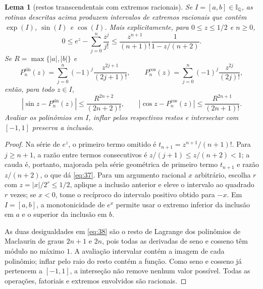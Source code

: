 \documentclass[11pt,a4paper]{article}
\theoremstyle{preciso}
\newtheorem{lema}[teorema]{Lema}
\theoremstyle{definition}
\newcommand{\Q}{\mathbb Q}
\newcommand{\eqn}[2]{\begin{equation}\label{eq:#1}#2\end{equation}}
\begin{document}
\begin{lema}[restos transcendentais com extremos racionais]
Se $I=[a,b]\in\mathbb I_{\Q}$, as rotinas descritas acima produzem intervalos de extremos racionais que contêm $\exp(I)$, $\sin(I)$ e $\cos(I)$. Mais explicitamente, para $0\le z\le1/2$ e $n\ge0$,
\eqn{37}{0\le e^z-\sum_{j=0}^n\frac{z^j}{j!}
\le\frac{z^{n+1}}{(n+1)!}\frac1{1-z/(n+2)}.}
Se $R=\max\{|a|,|b|\}$ e
\[
P_n^{\sin}(z)=\sum_{j=0}^n(-1)^j\frac{z^{2j+1}}{(2j+1)!},\qquad
P_n^{\cos}(z)=\sum_{j=0}^n(-1)^j\frac{z^{2j}}{(2j)!},
\]
então, para todo $z\in I$,
\eqn{38}{|\sin z-P_n^{\sin}(z)|\le\frac{R^{2n+2}}{(2n+2)!},\qquad
|\cos z-P_n^{\cos}(z)|\le\frac{R^{2n+1}}{(2n+1)!}.}
Avaliar os polinômios em $I$, inflar pelos respectivos restos e intersectar com $[-1,1]$ preserva a inclusão.
\end{lema}
\begin{proof}
Na série de $e^z$, o primeiro termo omitido é $t_{n+1}=z^{n+1}/(n+1)!$. Para $j\ge n+1$, a razão entre termos consecutivos é $z/(j+1)\le z/(n+2)<1$; a cauda é, portanto, majorada pela série geométrica de primeiro termo $t_{n+1}$ e razão $z/(n+2)$, o que dá \eqref{eq:37}. Para um argumento racional $x$ arbitrário, escolha $r$ com $z=|x|/2^r\le1/2$, aplique a inclusão anterior e eleve o intervalo ao quadrado $r$ vezes; se $x<0$, tome o recíproco do intervalo positivo obtido para $-x$. Em $I=[a,b]$, a monotonicidade de $e^x$ permite usar o extremo inferior da inclusão em $a$ e o superior da inclusão em $b$.

As duas desigualdades em \eqref{eq:38} são o resto de Lagrange dos polinômios de Maclaurin de graus $2n+1$ e $2n$, pois todas as derivadas de seno e cosseno têm módulo no máximo $1$. A avaliação intervalar contém a imagem de cada polinômio; inflar pelo raio do resto contém a função. Como seno e cosseno já pertencem a $[-1,1]$, a interseção não remove nenhum valor possível. Todas as operações, fatoriais e extremos envolvidos são racionais.
\end{proof}
\end{document}

